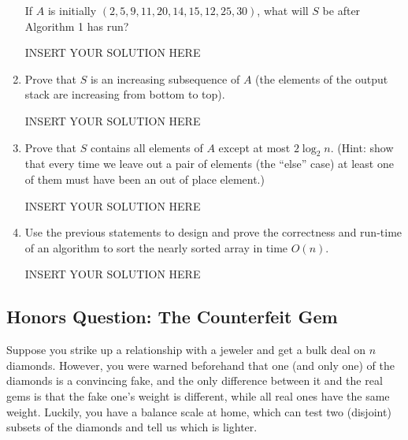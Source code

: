 \begin{enumerate}
    \smallskip
    If $A$ is initially $(2,5,9,11,20,14,15,12,25,30)$, what will $S$ be after Algorithm 1 has run?

\begin{solution}   INSERT YOUR SOLUTION HERE   \end{solution}

    
    
    \item Prove that $S$ is an increasing subsequence of $A$ (the elements of the output stack are increasing from bottom to top).

\begin{solution}   INSERT YOUR SOLUTION HERE   \end{solution}
    
    
    \item Prove that $S$ contains all elements of $A$ except at most $2\log_2 n$. (Hint: show that every time we leave out a pair of elements (the ``else'' case) at least one of them must have been an out of place element.)

\begin{solution}   INSERT YOUR SOLUTION HERE   \end{solution}

    
    \item Use the previous statements to design and prove the correctness and run-time of an algorithm to sort the nearly sorted array in time $O(n)$. 
    

\begin{solution}   INSERT YOUR SOLUTION HERE   \end{solution}
\end{enumerate}





    



\subsection*{Honors Question: The Counterfeit Gem}
Suppose you strike up a relationship with a jeweler and get a bulk deal on $n$ diamonds. However, you were warned beforehand that one (and only one) of the diamonds is a convincing fake, and the only difference between it and the real gems is that the fake one's weight is different, while all real ones have the same weight. Luckily, you have a balance scale at home, which can test two (disjoint) subsets of the diamonds and tell us which is lighter. 

